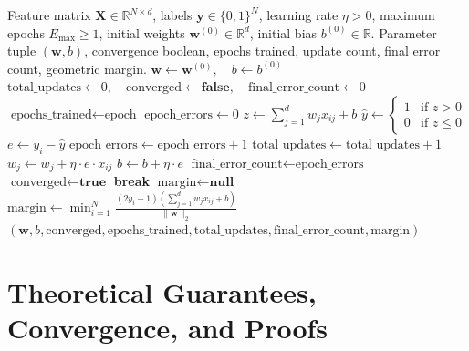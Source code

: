 \documentclass[11pt]{article}
\begin{document}
\begin{algorithm}[H]
\caption{Perceptron Mistake-Driven Learning Routine}
\label{alg:perceptron}
\begin{algorithmic}[1]
\Require Feature matrix $\mathbf{X} \in \mathbb{R}^{N \times d}$, labels $\mathbf{y} \in \{0, 1\}^N$, learning rate $\eta > 0$, maximum epochs $E_{\max} \ge 1$, initial weights $\mathbf{w}^{(0)} \in \mathbb{R}^d$, initial bias $b^{(0)} \in \mathbb{R}$.
\Ensure Parameter tuple $(\mathbf{w}, b)$, convergence boolean, epochs trained, update count, final error count, geometric margin.
\State $\mathbf{w} \gets \mathbf{w}^{(0)}, \quad b \gets b^{(0)}$
\State $\text{total\_updates} \gets 0, \quad \text{converged} \gets \textbf{false}, \quad \text{final\_error\_count} \gets 0$
    \State $\text{epochs\_trained} \gets \text{epoch}$
    \State $\text{epoch\_errors} \gets 0$
        \State $z \gets \sum_{j=1}^d w_j x_{ij} + b$
        \State $\hat{y} \gets \begin{cases} 1 & \text{if } z > 0 \\ 0 & \text{if } z \le 0 \end{cases}$
        \State $e \gets y_i - \hat{y}$
            \State $\text{epoch\_errors} \gets \text{epoch\_errors} + 1$
            \State $\text{total\_updates} \gets \text{total\_updates} + 1$
                \State $w_j \gets w_j + \eta \cdot e \cdot x_{ij}$
            \EndFor
            \State $b \gets b + \eta \cdot e$
        \EndIf
    \EndFor
    \State $\text{final\_error\_count} \gets \text{epoch\_errors}$
        \State $\text{converged} \gets \textbf{true}$
        \State \textbf{break}
    \EndIf
\EndFor
\State $\text{margin} \gets \textbf{null}$
    \State $\text{margin} \gets \min_{i=1}^N \frac{(2y_i - 1)(\sum_{j=1}^d w_j x_{ij} + b)}{\|\mathbf{w}\|_2}$
\EndIf
\State \Return $(\mathbf{w}, b, \text{converged}, \text{epochs\_trained}, \text{total\_updates}, \text{final\_error\_count}, \text{margin})$
\end{algorithmic}
\end{algorithm}

\section{Theoretical Guarantees, Convergence, and Proofs}
\label{sec:correctness}
\end{document}

